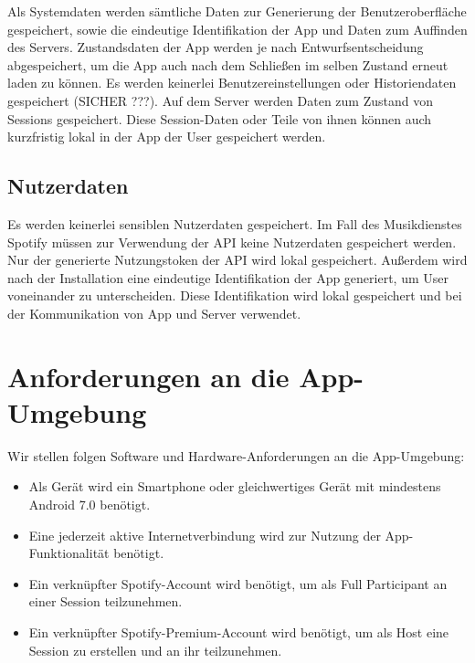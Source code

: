 \documentclass[oneside, ngerman]{sdqtechreport}
\begin{document}
Als Systemdaten werden sämtliche Daten zur Generierung der Benutzeroberfläche gespeichert, sowie die eindeutige Identifikation der App und Daten zum Auffinden des Servers. Zustandsdaten der App werden je nach Entwurfsentscheidung abgespeichert, um die App auch nach dem Schließen im selben Zustand erneut laden zu können. Es werden keinerlei Benutzereinstellungen oder Historiendaten gespeichert (SICHER ???). Auf dem Server werden Daten zum Zustand von Sessions gespeichert. Diese Session-Daten oder Teile von ihnen können auch kurzfristig lokal in der App der User gespeichert werden.

\section{Nutzerdaten}
\label{sec:Produktdaten:Nutzerdaten}

Es werden keinerlei sensiblen Nutzerdaten gespeichert. Im Fall des Musikdienstes Spotify müssen zur Verwendung der API keine Nutzerdaten gespeichert werden. Nur der generierte Nutzungstoken der API wird lokal gespeichert. Außerdem wird nach der Installation eine eindeutige Identifikation der App generiert, um User voneinander zu unterscheiden. Diese Identifikation wird lokal gespeichert und bei der Kommunikation von App und Server verwendet.



\chapter{Anforderungen an die App-Umgebung}
\label{chap:Appumgebung}

Wir stellen folgen Software und Hardware-Anforderungen an die App-Umgebung:

\begin{itemize}
    \item Als Gerät wird ein Smartphone oder gleichwertiges Gerät mit mindestens Android 7.0 benötigt.
    \item Eine jederzeit aktive Internetverbindung wird zur Nutzung der App-Funktionalität benötigt.
    \item Ein verknüpfter Spotify-Account wird benötigt, um als Full Participant an einer Session teilzunehmen.
    \item Ein verknüpfter Spotify-Premium-Account wird benötigt, um als Host eine Session zu erstellen und an ihr teilzunehmen.
\end{itemize}
\end{document}
